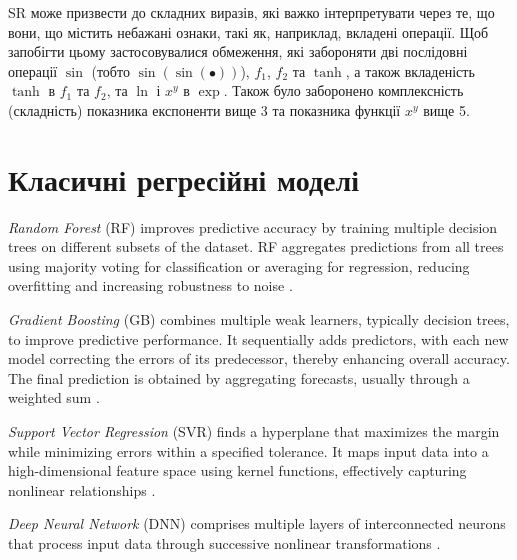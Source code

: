 \documentclass[10pt,a5paper,titlepage,oneside]{book}
\numberwithin{equation}{part}
\begin{document}
SR може призвести до складних виразів, які важко інтерпретувати через те, що вони, що містить небажані ознаки, такі як, наприклад,
вкладені операції. 
Щоб запобігти цьому застосовувалися обмеження, які забороняти
дві послідовні операції $\sin$ (тобто $\sin(\sin(\bullet))$), $f_1$, $f_2$ та $\tanh$,
а також вкладеність $\tanh$ в $f_1$ та $f_2$,
та $\ln$ і $x^y$ в $\exp$.
Також було заборонено комплексність (складність) показника експоненти вище 3 та показника функції $x^y$ вище 5.



\section{Класичні регресійні моделі}

\emph{Random Forest} (RF) improves predictive accuracy by training multiple decision trees on different subsets of the dataset.
RF aggregates predictions from all trees using majority voting for classification or averaging for regression,
reducing overfitting and increasing robustness to noise \cite{Breiman2001}.

\emph{Gradient Boosting} (GB) combines multiple weak learners, typically decision trees, to improve predictive performance.
It sequentially adds predictors, with each new model correcting the errors of its predecessor, thereby enhancing overall accuracy.
The final prediction is obtained by aggregating forecasts, usually through a weighted sum \cite{Natekin2013}.

\emph{Support Vector Regression }(SVR) finds a hyperplane that maximizes the margin while minimizing errors within a specified tolerance.
It maps input data into a high-dimensional feature space using kernel functions, effectively capturing nonlinear relationships \cite{Cao2020}.

\emph{Deep Neural Network} (DNN) comprises multiple layers of interconnected neurons that process input data
through successive nonlinear transformations \cite{Liu2023}.




%
%
%
\end{document}
